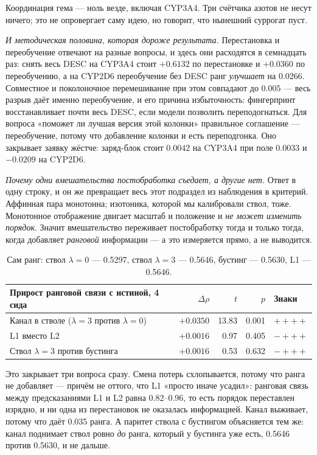 Координация гема --- ноль везде, включая CYP3A4. Три счётчика азотов не несут ничего; это не
опровергает саму идею, но говорит, что нынешний суррогат пуст.

\emph{И методическая половина, которая дороже результата.} Перестановка и переобучение отвечают на
разные вопросы, и здесь они расходятся в семнадцать раз: снять весь \textsc{DESC} на CYP3A4 стоит
$+0.6132$ по перестановке и $+0.0360$ по переобучению, а на CYP2D6 переобучение без \textsc{DESC}
ранг \emph{улучшает} на $0.0266$. Совместное и поколоночное перемешивание при этом совпадают до
$0.005$ --- весь разрыв даёт именно переобучение, и его причина избыточность: фингерпринт
восстанавливает почти весь \textsc{DESC}, если модели позволить переподогнаться. Для вопроса
«поможет ли лучшая версия этой колонки» правильное соглашение --- переобучение, потому что
добавление колонки и есть переподгонка. Оно закрывает заявку жёстче: заряд-блок стоит $0.0042$ на
CYP3A4 при поле $0.0033$ и $-0.0209$ на CYP2D6.

\emph{Почему одни вмешательства постобработка съедает, а другие нет.} Ответ в одну строку, и
он же превращает весь этот подраздел из наблюдения в критерий. Аффинная пара монотонна;
изотоника, которой мы калибровали ствол, тоже. Монотонное отображение двигает масштаб и
положение и \emph{не может изменить порядок}. Значит вмешательство переживает постобработку
тогда и только тогда, когда добавляет \emph{ранговой} информации --- а это измеряется прямо, а
не выводится.

\begin{table}[htbp]\centering\small
\begin{tabularx}{\textwidth}{@{}Xrrrl@{}}
\toprule
Прирост ранговой связи с истиной, 4 сида & $\Delta\rho$ & $t$ & $p$ & Знаки \\
\midrule
Канал в стволе ($\lambda=3$ против $\lambda=0$) & $\mathbf{+0.0350}$ & 13.83 & 0.001 & $++++$ \\
L1 вместо L2 & $+0.0016$ & 0.97 & 0.405 & $-{+}{+}{+}$ \\
Ствол $\lambda=3$ против бустинга & $+0.0016$ & 0.53 & 0.632 & $-{+}{+}{+}$ \\
\bottomrule
\end{tabularx}
\caption{Сам ранг: ствол $\lambda=0$ --- 0.5297, ствол $\lambda=3$ --- 0.5646, бустинг ---
0.5630, L1 --- 0.5646.}
\label{tab:rank}
\end{table}

Это закрывает три вопроса сразу. Смена потерь схлопывается, потому что ранга не добавляет ---
причём не оттого, что L1 «просто иначе усадил»: ранговая связь между предсказаниями L1 и L2
равна 0.82--0.96, то есть порядок переставлен изрядно, и ни одна из перестановок не оказалась
информацией. Канал выживает, потому что даёт 0.035 ранга. А паритет ствола с бустингом
объясняется тем же: канал поднимает ствол ровно \emph{до} ранга, который у бустинга уже есть,
0.5646 против 0.5630, и не дальше.

